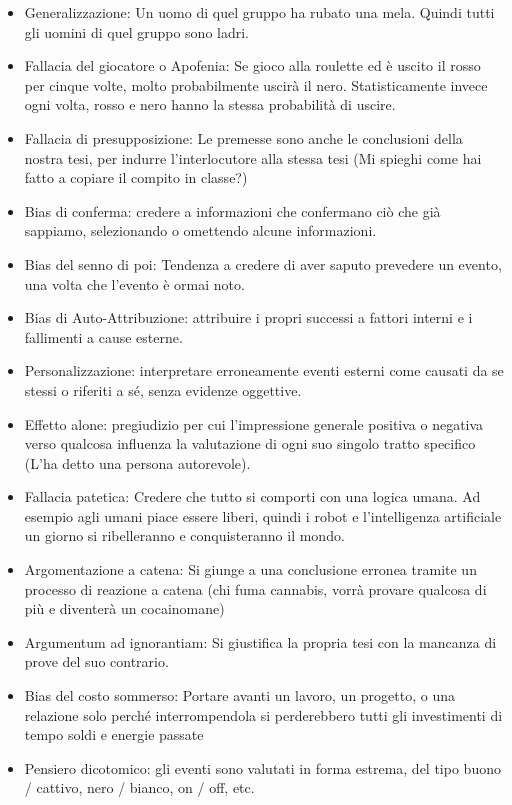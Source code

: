\documentclass[12pt]{book} %
\begin{document}
\begin{itemize}
\item Generalizzazione: Un uomo di quel gruppo ha rubato una mela. Quindi tutti gli uomini di quel gruppo sono ladri.
\item Fallacia del giocatore o Apofenia: Se gioco alla roulette ed è uscito il rosso per cinque volte, molto probabilmente uscirà il nero. Statisticamente invece ogni volta, rosso e nero hanno la stessa probabilità di uscire.
\item Fallacia di presupposizione: Le premesse sono anche le conclusioni della nostra tesi, per indurre l'interlocutore alla stessa tesi (Mi spieghi come hai fatto a copiare il compito in classe?)
\item Bias di conferma: credere a informazioni che confermano ciò che già sappiamo, selezionando o omettendo alcune informazioni.
\item Bias del senno di poi: Tendenza a credere di aver saputo prevedere un evento, una volta che l'evento è ormai noto. 
\item Bias di Auto-Attribuzione: attribuire i propri successi a fattori interni e i fallimenti a cause esterne.
\item Personalizzazione: interpretare erroneamente eventi esterni come causati da se stessi o riferiti a sé, senza evidenze oggettive.
\item Effetto alone: pregiudizio per cui l'impressione generale positiva o negativa verso qualcosa influenza la valutazione di ogni suo singolo tratto specifico (L'ha detto una persona autorevole).
\item Fallacia patetica: Credere che tutto si comporti con una logica umana. Ad esempio agli umani piace essere liberi, quindi i robot e l'intelligenza artificiale un giorno si ribelleranno e conquisteranno il mondo.
\item Argomentazione a catena: Si giunge a una conclusione erronea tramite un processo di reazione a catena (chi fuma cannabis, vorrà provare qualcosa di più e diventerà un cocainomane)
\item Argumentum ad ignorantiam: Si giustifica la propria tesi con la mancanza di prove del suo contrario.
\item Bias del costo sommerso: Portare avanti un lavoro, un progetto, o una relazione solo perché interrompendola si perderebbero tutti gli investimenti di tempo soldi e energie passate
\item Pensiero dicotomico: gli eventi sono valutati in forma estrema, del tipo buono / cattivo, nero / bianco, on / off, etc.

\end{itemize}
\end{document}
